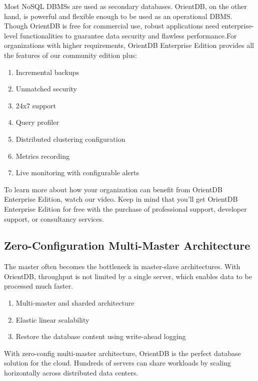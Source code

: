 \documentclass[
	final,
	a4paper,
	oneside,
	parskip=half,
	headings=standardclasses,
	headings=big,
	pointednumbers,
    fleqn
]{scrartcl}
\begin{document}
\begin{multicols*}{2}
            Most NoSQL DBMSs are used as secondary databases. OrientDB, on the other hand, is powerful and flexible enough to be used as an operational DBMS.
            Though OrientDB is free for commercial use, robust applications need enterprise-level functionalities to guarantee data security and flawless performance.For organizations with higher requirements, OrientDB Enterprise Edition provides all the features of our community edition plus:

            \begin{enumerate}
                \item Incremental backups
                \item Unmatched security
                \item 24x7 support
                \item Query profiler
                \item Distributed clustering configuration
                \item Metrics recording
                \item Live monitoring with configurable alerts
            \end{enumerate}
	
            To learn more about how your organization can benefit from OrientDB Enterprise Edition, watch our video. Keep in mind that you'll get OrientDB Enterprise Edition for free with the purchase of professional support, developer support, or consultancy services.

        \subsection{Zero-Configuration Multi-Master Architecture}

            The master often becomes the bottleneck in master-slave architectures. With OrientDB, throughput is not limited by a single server, which enables data to be processed much faster.

            \begin{enumerate}
                \item Multi-master and sharded architecture
                \item Elastic linear scalability
                \item Restore the database content using write-ahead logging
            \end{enumerate}

            With zero-config multi-master architecture, OrientDB is the perfect database solution for the cloud. Hundreds of servers can share workloads by scaling horizontally across distributed data centers.


\end{multicols*}
\end{document}
